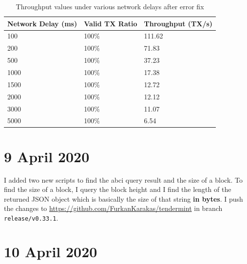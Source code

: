 \documentclass{article}
\begin{document}
\begin{table}[ht]
    \centering
    \caption{Throughput values under various network delays after error fix}
    \begin{tabular}{|l|l|l|}
    \hline
    \textbf{Network Delay (ms)} & \textbf{Valid TX Ratio} & \textbf{Throughput (TX/s)} \\ \hline
    100                         & 100\%                   & 111.62                       \\ \hline
    200                         & 100\%                   & 71.83                       \\ \hline
    500                         & 100\%                   & 37.23                       \\ \hline
    1000                        & 100\%                   & 17.38                       \\ \hline
    1500                        & 100\%                   & 12.72                       \\ \hline
    2000                        & 100\%                   & 12.12                        \\ \hline
    3000                        & 100\%                   & 11.07                       \\ \hline
    5000                        & 100\%                   & 6.54                       \\ \hline
    \end{tabular}
    \label{tab:Network delay throughput after fix}
\end{table}


\section*{9 April 2020}

I added two new scripts to find the abci query result and the size of a block. To find the size of a block, I query the block height and I find the length of the returned JSON object which is basically the size of that string \textbf{in bytes}. I push the changes to \url{https://github.com/FurkanKarakas/tendermint} in branch \texttt{release/v0.33.1}.

\section*{10 April 2020}
\end{document}
